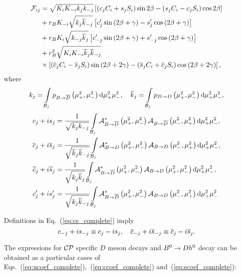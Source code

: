 \documentclass[a4paper,11pt]{article}
\begin{document}
\begin{equation}\label{eq:scoef_binned_complete}
 \begin{split}
  \mathcal{F}_{ij}
  &= \sqrt{K_iK_{-i}k_jk_{-j}}\left[
    \left(c_jC_i + s_jS_i\right)\sin{2\beta} - \left(s_jC_i - c_jS_i\right)\cos{2\beta} \right] \\
  &+ r_{B}K_{-i}\sqrt{k_j\overline{k}_{-j}}\left[c^{\prime}_j\sin{\left(2\beta+ \gamma\right)} -
                                  s^{\prime}_j\cos{\left(2\beta+ \gamma\right)}\right]\\
  &+ r_{B}K_i\sqrt{k_{-j}\overline{k}_j}\left[c^{\prime}_{-j}\sin{\left(2\beta+\gamma\right)} +
                                 s^{\prime}_{-j}\cos{\left(2\beta+\gamma\right)}\right]\\
  &+ r_{B}^2\sqrt{K_iK_{-i}\overline{k}_j\overline{k}_{-j}}\\ 
  & \times\left[\left(\overline{c}_jC_i - \overline{s}_jS_i\right)\sin{\left(2\beta+2\gamma\right)} - 
               \left(\overline{s}_jC_i + \overline{c}_jS_i\right)\cos{\left(2\beta+2\gamma\right)}\right],
 \end{split}
\end{equation}
where
\begin{equation}\label{eq:kjkmj}
 k_j = \int\limits_{\mathcal{B}_j}p_{B\to\overline{D}}\left(\mu^2_{+},\mu^2_{-}\right) \mathrm{d}\mu^2_{+}\mu^2_{-},\quad
 \overline{k}_j = \int\limits_{\mathcal{B}_j}p_{B\to D}\left(\mu^2_{+},\mu^2_{-}\right) \mathrm{d}\mu^2_{+}\mu^2_{-},
\end{equation}
\begin{subequations}\label{eq:cs_complete}
 \begin{align}
  c_j  + is_j  &= \frac{1}{\sqrt{k_jk_{-j}}}\int\limits_{\mathcal{B}_j}
                  \mathcal{A}_{B\to\overline{D}}^*\left(\mu^2_{+},\mu^2_{-}\right)\mathcal{A}_{B\to\overline{D}}\left(\mu^2_{-},\mu^2_{+}\right)\mathrm{d}\mu^2_{+}\mu^2_{-},\\
  \overline{c}_j + i\overline{s}_j &= \frac{1}{\sqrt{\overline{k}_j\overline{k}_{-j}}}\int\limits_{\mathcal{B}_j}
                  \mathcal{A}_{B\to D}^*\left(\mu^2_{+},\mu^2_{-}\right)\mathcal{A}_{B\to D}\left(\mu^2_{-},\mu^2_{+}\right)\mathrm{d}\mu^2_{+}\mu^2_{-}, \\
  \widetilde{c}_j + i\widetilde{s}_j &= \frac{1}{\sqrt{k_j\overline{k}_j}}\int\limits_{\mathcal{B}_j}
                  \mathcal{A}_{B\to\overline{D}}^*\left(\mu^2_{+},\mu^2_{-}\right)\mathcal{A}_{B\to D}\left(\mu^2_{+},\mu^2_{-}\right)\mathrm{d}\mu^2_{+}\mu^2_{-}, \\
  c^{\prime}_j + is^{\prime}_j &= \frac{1}{\sqrt{k_j\overline{k}_{-j}}}\int\limits_{\mathcal{B}_j}
                  \mathcal{A}_{B\to\overline{D}}^*\left(\mu^2_{+},\mu^2_{-}\right)\mathcal{A}_{B\to D}\left(\mu^2_{-},\mu^2_{+}\right)\mathrm{d}\mu^2_{+}\mu^2_{-}
 \end{align}
\end{subequations}

Definitions in Eq.~(\ref{eq:cs_complete}) imply
\begin{equation}\label{eq:cs_complete_symmetries}
  c_{-j} + is_{-j} \equiv c_j - is_j,\quad
  \overline{c}_{-j} + i\overline{s}_{-j} \equiv \overline{c}_j - i\overline{s}_j.
\end{equation}

The expressions for $\mathcal{CP}$ specific $D$ meson decays and $B^0\to D h^0$ decay 
can be obtained as a particular cases of Eqs.~(\ref{eq:ucoef_complete}),~(\ref{eq:ccoef_complete}) 
and~(\ref{eq:scoef_complete}):
\end{document}
